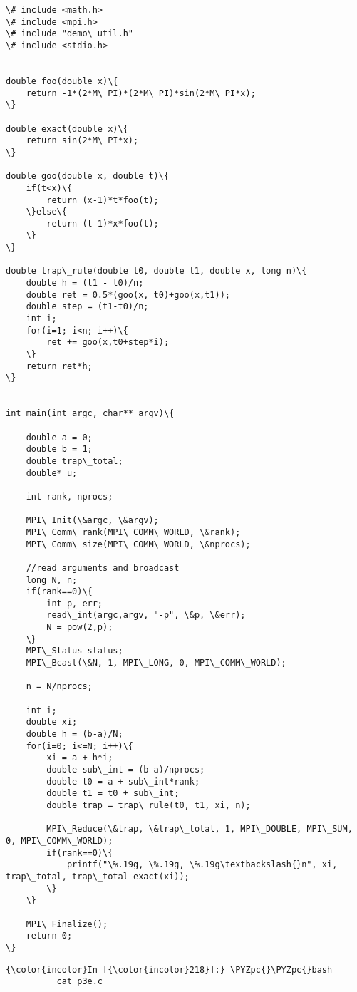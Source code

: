 \documentclass[11pt]{article}
\def\PYZpc{\char`\%}
\begin{document}
    \begin{Verbatim}[commandchars=\\\{\}]
\# include <math.h>
\# include <mpi.h>
\# include "demo\_util.h"
\# include <stdio.h>


double foo(double x)\{
    return -1*(2*M\_PI)*(2*M\_PI)*sin(2*M\_PI*x);
\}

double exact(double x)\{
    return sin(2*M\_PI*x);
\}

double goo(double x, double t)\{
    if(t<x)\{
        return (x-1)*t*foo(t);
    \}else\{
        return (t-1)*x*foo(t);
    \}
\}

double trap\_rule(double t0, double t1, double x, long n)\{
    double h = (t1 - t0)/n;
    double ret = 0.5*(goo(x, t0)+goo(x,t1));
    double step = (t1-t0)/n;
    int i;
    for(i=1; i<n; i++)\{
        ret += goo(x,t0+step*i);
    \}
    return ret*h;
\}


int main(int argc, char** argv)\{

    double a = 0;
    double b = 1;
    double trap\_total;
    double* u;    

    int rank, nprocs;

    MPI\_Init(\&argc, \&argv);
    MPI\_Comm\_rank(MPI\_COMM\_WORLD, \&rank);
    MPI\_Comm\_size(MPI\_COMM\_WORLD, \&nprocs);

    //read arguments and broadcast
    long N, n;
    if(rank==0)\{
        int p, err;
        read\_int(argc,argv, "-p", \&p, \&err);
        N = pow(2,p);
    \}
    MPI\_Status status;
    MPI\_Bcast(\&N, 1, MPI\_LONG, 0, MPI\_COMM\_WORLD);

    n = N/nprocs;

    int i;
    double xi;
    double h = (b-a)/N;
    for(i=0; i<=N; i++)\{
        xi = a + h*i;
        double sub\_int = (b-a)/nprocs;
        double t0 = a + sub\_int*rank;
        double t1 = t0 + sub\_int;
        double trap = trap\_rule(t0, t1, xi, n);

        MPI\_Reduce(\&trap, \&trap\_total, 1, MPI\_DOUBLE, MPI\_SUM, 0, MPI\_COMM\_WORLD);
        if(rank==0)\{
            printf("\%.19g, \%.19g, \%.19g\textbackslash{}n", xi, trap\_total, trap\_total-exact(xi));
        \}
    \}
    
    MPI\_Finalize();
    return 0;
\}

    \end{Verbatim}

    \begin{Verbatim}[commandchars=\\\{\}]
{\color{incolor}In [{\color{incolor}218}]:} \PYZpc{}\PYZpc{}bash
          cat p3e.c
\end{Verbatim}
\end{document}
